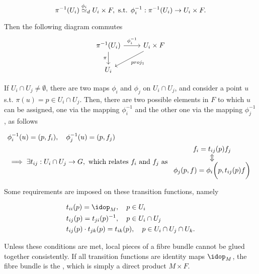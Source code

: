 \begin{itemize}
        $$
            \pi^{-1}(U_i) \overset{\phi_i}{\simeq}_{d} U_i \times F, \textnormal{ s.t. } \phi_i^{-1}: \pi^{-1}(U_i) \rightarrow U_i \times F.
        $$
        \medbreak

        Then the following diagram commutes
        \[
        \begin{tikzcd}
          \pi^{-1}(U_i) \arrow[d, "\pi"'] \arrow[r, "\phi_i^{-1}"] & U_i \times F \arrow[ld, "proj_1"] \\
                    U_i                                                 &            
        \end{tikzcd}
        \]

        If $U_i \cap U_j \neq \emptyset$, there are two maps $\phi_i$ and $\phi_j$ on $U_i \cap U_j$, and consider a point $u$ s.t. $\pi(u) = p \in U_i \cap U_j$. 
        Then, there are two possible elements in $F$ to which $u$ can be assigned, one via the mapping $\phi_i^{-1}$ and the other one via the mapping $\phi_j^{-1}$, as follows 

        \begin{equation}
        \begin{split}
            &\phi^{-1}_i(u) = (p, f_i), \quad \phi^{-1}_j (u) = (p, f_j) \\
            & \implies \exists t_{ij}: U_i \cap U_j \rightarrow G, \textnormal{ which relates $f_i$ and $f_j$ as }
            \begin{array}{cc}
                f_i = t_{ij}(p) f_j \\
                \Updownarrow \\
                \phi_j(p, f) = \phi_i \bigg(p, t_{ij}(p) f\bigg)
            \end{array}
        \end{split}
        \end{equation}

    Some requirements are imposed on these transition functions, namely 

    \begin{equation}
        \begin{split}
            &t_{ii}(p) = \idop_{M}, \quad p \in U_i \\
            &t_{ij}(p) = t_{ji}(p)^{-1}, \quad p \in U_i \cap U_j \\
            &t_{ij}(p) \cdot t_{jk}(p) = t_{ik}(p), \quad p \in U_i \cap U_j \cap U_k.
        \end{split}
    \end{equation}

    Unless these conditions are met, local pieces of a fibre bundle cannot be glued together consistently. If all transition functions are identity maps $\idop_M$, the fibre bundle is the , which is simply a direct product $M \times F$. 
 
\end{itemize} \bigbreak 

